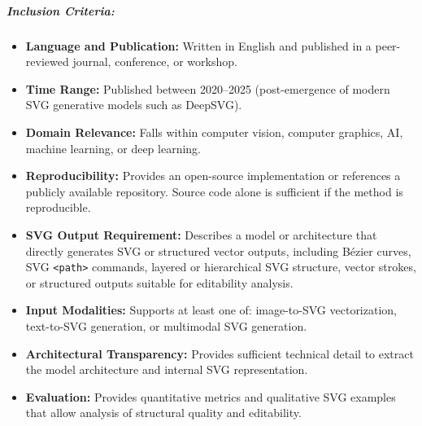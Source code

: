 \subparagraph{Inclusion Criteria:}
\begin{itemize}
    \item \textbf{Language and Publication:} Written in English and published in a peer-reviewed journal, conference, or workshop.
    \item \textbf{Time Range:} Published between 2020--2025 (post-emergence of modern SVG generative models such as DeepSVG).
    \item \textbf{Domain Relevance:} Falls within computer vision, computer graphics, AI, machine learning, or deep learning.
    \item \textbf{Reproducibility:} Provides an open-source implementation or references a publicly available repository. Source code alone is sufficient if the method is reproducible.
    \item \textbf{SVG Output Requirement:} Describes a model or architecture that directly generates SVG or structured vector outputs, including B\'{e}zier curves, SVG \texttt{<path>} commands, layered or hierarchical SVG structure, vector strokes, or structured outputs suitable for editability analysis.
    \item \textbf{Input Modalities:} Supports at least one of: image-to-SVG vectorization, text-to-SVG generation, or multimodal SVG generation.
    \item \textbf{Architectural Transparency:} Provides sufficient technical detail to extract the model architecture and internal SVG representation.
    \item \textbf{Evaluation:} Provides quantitative metrics and qualitative SVG examples that allow analysis of structural quality and editability.
\end{itemize}

